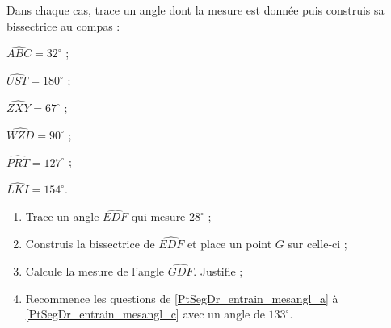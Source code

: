 \begin{exercice}
Dans chaque cas, trace un angle dont la mesure est donnée puis construis sa bissectrice au compas :
\begin{colenumerate}{3}
 \item $\widehat{ABC} = 32^\circ$ ;
  \item $\widehat{UST} = 180^\circ$ ; 
  \item $\widehat{ZXY} = 67^\circ$ ;
  \item $\widehat{WZD} = 90^\circ$ ;
  \item $\widehat{PRT} = 127^\circ$ ;
  \item $\widehat{LKI} = 154^\circ$.
 \end{colenumerate}
\end{exercice} 


\begin{exercice}
\begin{enumerate}
 \item Trace un angle $\widehat{EDF}$ qui mesure $28^\circ$ ; \label{PtSegDr_entrain_mesangl_a}
 \item Construis la bissectrice de $\widehat{EDF}$ et place un point $G$ sur celle‑ci ;
 \item Calcule la mesure de l'angle $\widehat{GDF}$. Justifie ; \label{PtSegDr_entrain_mesangl_c}
 \item Recommence les questions de \ref{PtSegDr_entrain_mesangl_a} à \ref{PtSegDr_entrain_mesangl_c} avec un angle de $133^\circ$.
 \end{enumerate}
\end{exercice} 



\vspace*{3cm}

\phantom{coucou}

\pagebreak




